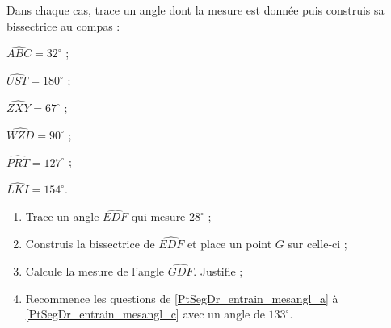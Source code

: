 \begin{exercice}
Dans chaque cas, trace un angle dont la mesure est donnée puis construis sa bissectrice au compas :
\begin{colenumerate}{3}
 \item $\widehat{ABC} = 32^\circ$ ;
  \item $\widehat{UST} = 180^\circ$ ; 
  \item $\widehat{ZXY} = 67^\circ$ ;
  \item $\widehat{WZD} = 90^\circ$ ;
  \item $\widehat{PRT} = 127^\circ$ ;
  \item $\widehat{LKI} = 154^\circ$.
 \end{colenumerate}
\end{exercice} 


\begin{exercice}
\begin{enumerate}
 \item Trace un angle $\widehat{EDF}$ qui mesure $28^\circ$ ; \label{PtSegDr_entrain_mesangl_a}
 \item Construis la bissectrice de $\widehat{EDF}$ et place un point $G$ sur celle‑ci ;
 \item Calcule la mesure de l'angle $\widehat{GDF}$. Justifie ; \label{PtSegDr_entrain_mesangl_c}
 \item Recommence les questions de \ref{PtSegDr_entrain_mesangl_a} à \ref{PtSegDr_entrain_mesangl_c} avec un angle de $133^\circ$.
 \end{enumerate}
\end{exercice} 



\vspace*{3cm}

\phantom{coucou}

\pagebreak




